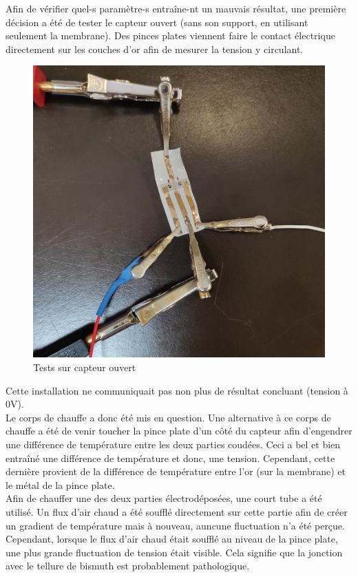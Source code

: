 Afin de vérifier quel-s paramètre-s entraîne-nt un mauvais résultat, une première décision a été de tester le \gls{capteur} ouvert (sans son support,
en utilisant seulement la membrane).
Des pinces plates viennent faire le contact électrique directement sur les couches d'or afin de mesurer la tension y circulant.
\begin{figure}[H]
    \centering
    \includegraphics[scale = 0.05]{assets/figures/CapteurOuvert.jpg}
    \caption{Tests sur capteur ouvert}
    \label{fig:capteurOuvert}
\end{figure}
Cette installation ne communiquait pas non plus de résultat concluant (tension à 0V). \\

Le corps de chauffe a donc été mis en question. Une alternative à ce corps de chauffe a été de venir toucher la pince plate d'un côté du
capteur afin d'engendrer une différence de température entre les deux parties coudées. Ceci a bel et bien entraîné une différence de
température et donc, une tension. Cependant, cette dernière provient de la différence de température entre l'or (sur la membrane) et le métal
de la pince plate. \\

Afin de chauffer une des deux parties électrodéposées, une court tube a été utilisé. Un flux d'air chaud a été soufflé directement sur cette
partie afin de créer un gradient de température mais à nouveau, auncune fluctuation n'a été perçue. Cependant, lorsque le flux d'air chaud
était soufflé au niveau de la pince plate, une plus grande fluctuation de tension était visible. Cela signifie que la jonction avec le tellure
de bismuth est probablement pathologique.\\

